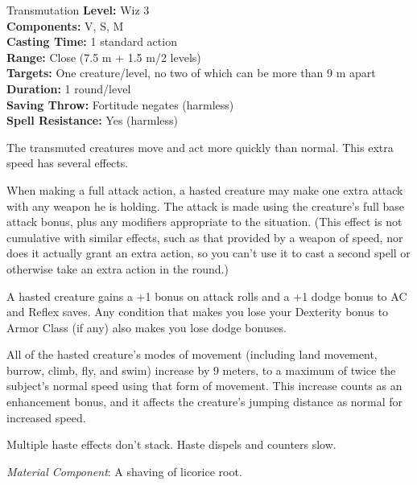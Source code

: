{Transmutation}
{
	\textbf{Level:}
	Wiz 3\\
	\textbf{Components:}
	V, S, M\\
	\textbf{Casting Time:}
	1 standard action\\
	\textbf{Range:}
	Close (7.5 m + 1.5 m/2 levels)\\
	\textbf{Targets:}
	One creature/level, no two of which can be more than 9 m apart\\
	\textbf{Duration:}
	1 round/level\\
	\textbf{Saving Throw:}
	Fortitude negates (harmless)\\
	\textbf{Spell Resistance:}
	Yes (harmless)\\
}
{
	The transmuted creatures move and act more quickly than normal. This extra speed has several effects.

	When making a full attack action, a hasted creature may make one extra attack with any weapon he is holding. The attack is made using the creature's full base attack bonus, plus any modifiers appropriate to the situation. (This effect is not cumulative with similar effects, such as that provided by a weapon of speed, nor does it actually grant an extra action, so you can't use it to cast a second spell or otherwise take an extra action in the round.)

	A hasted creature gains a +1 bonus on attack rolls and a +1 dodge bonus to AC and Reflex saves. Any condition that makes you lose your Dexterity bonus to Armor Class (if any) also makes you lose dodge bonuses.

	All of the hasted creature's modes of movement (including land movement, burrow, climb, fly, and swim) increase by 9 meters, to a maximum of twice the subject's normal speed using that form of movement. This increase counts as an enhancement bonus, and it affects the creature's jumping distance as normal for increased speed.

	Multiple haste effects don't stack. Haste dispels and counters slow.

	\textit{Material Component}:
	A shaving of licorice root.

}
